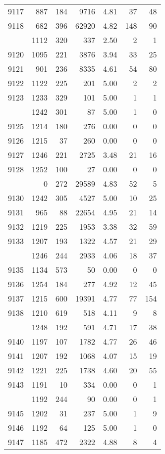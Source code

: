 \documentclass[
]{article}
\begin{document}
\begin{table}
\begin{tabular}[t]{lrrrrrr}
9117 & 887 & 184 & 9716 & 4.81 & 37 & 48\\
9118 & 682 & 396 & 62920 & 4.82 & 148 & 90\\
\addlinespace
9119 & 1112 & 320 & 337 & 2.50 & 2 & 1\\
9120 & 1095 & 221 & 3876 & 3.94 & 33 & 25\\
9121 & 901 & 236 & 8335 & 4.61 & 54 & 80\\
9122 & 1122 & 225 & 201 & 5.00 & 2 & 2\\
9123 & 1233 & 329 & 101 & 5.00 & 1 & 1\\
\addlinespace
9124 & 1242 & 301 & 87 & 5.00 & 1 & 0\\
9125 & 1214 & 180 & 276 & 0.00 & 0 & 0\\
9126 & 1215 & 37 & 260 & 0.00 & 0 & 0\\
9127 & 1246 & 221 & 2725 & 3.48 & 21 & 16\\
9128 & 1252 & 100 & 27 & 0.00 & 0 & 0\\
\addlinespace
9129 & 0 & 272 & 29589 & 4.83 & 52 & 5\\
9130 & 1242 & 305 & 4527 & 5.00 & 10 & 25\\
9131 & 965 & 88 & 22654 & 4.95 & 21 & 14\\
9132 & 1219 & 225 & 1953 & 3.38 & 32 & 59\\
9133 & 1207 & 193 & 1322 & 4.57 & 21 & 29\\
\addlinespace
9134 & 1246 & 244 & 2933 & 4.06 & 18 & 37\\
9135 & 1134 & 573 & 50 & 0.00 & 0 & 0\\
9136 & 1254 & 184 & 277 & 4.92 & 12 & 45\\
9137 & 1215 & 600 & 19391 & 4.77 & 77 & 154\\
9138 & 1210 & 619 & 518 & 4.11 & 9 & 8\\
\addlinespace
9139 & 1248 & 192 & 591 & 4.71 & 17 & 38\\
9140 & 1197 & 107 & 1782 & 4.77 & 26 & 46\\
9141 & 1207 & 192 & 1068 & 4.07 & 15 & 19\\
9142 & 1221 & 225 & 1738 & 4.60 & 20 & 55\\
9143 & 1191 & 10 & 334 & 0.00 & 0 & 1\\
\addlinespace
9144 & 1192 & 244 & 90 & 0.00 & 0 & 1\\
9145 & 1202 & 31 & 237 & 5.00 & 1 & 9\\
9146 & 1192 & 64 & 125 & 5.00 & 1 & 0\\
9147 & 1185 & 472 & 2322 & 4.88 & 8 & 4\\

\end{tabular}
\end{table}
\end{document}
